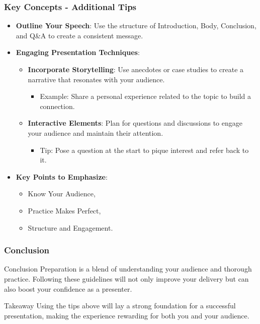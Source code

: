 \documentclass[aspectratio=169]{beamer}
\begin{document}
\begin{frame}[fragile]
    \frametitle{Key Concepts - Additional Tips}
    \begin{itemize}
        \item \textbf{Outline Your Speech}: 
        Use the structure of Introduction, Body, Conclusion, and Q\&A to create a consistent message.
        
        \item \textbf{Engaging Presentation Techniques}:
        \begin{itemize}
            \item \textbf{Incorporate Storytelling}: 
            Use anecdotes or case studies to create a narrative that resonates with your audience.
            \begin{itemize}
                \item Example: Share a personal experience related to the topic to build a connection.
            \end{itemize}

            \item \textbf{Interactive Elements}: 
            Plan for questions and discussions to engage your audience and maintain their attention.
            \begin{itemize}
                \item Tip: Pose a question at the start to pique interest and refer back to it.
            \end{itemize}
        \end{itemize}

        \item \textbf{Key Points to Emphasize}:
        \begin{itemize}
            \item Know Your Audience, 
            \item Practice Makes Perfect, 
            \item Structure and Engagement.
        \end{itemize}
    \end{itemize}
\end{frame}

\begin{frame}[fragile]
    \frametitle{Conclusion}
    \begin{block}{Conclusion}
        Preparation is a blend of understanding your audience and thorough practice. Following these guidelines will not only improve your delivery but can also boost your confidence as a presenter.
    \end{block}
    \begin{block}{Takeaway}
        Using the tips above will lay a strong foundation for a successful presentation, making the experience rewarding for both you and your audience.
    \end{block}
\end{frame}
\end{document}
